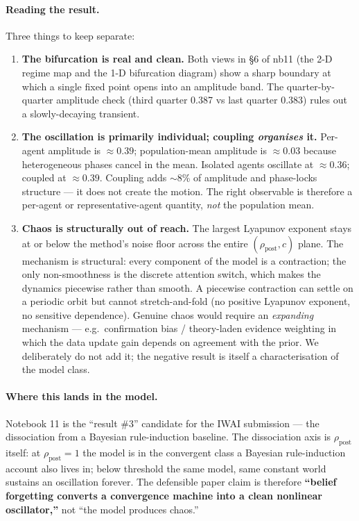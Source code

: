 \documentclass[11pt,a4paper]{article}
\theoremstyle{plain}
\begin{document}
\paragraph{Reading the result.} Three things to keep separate:
\begin{enumerate}\itemsep1pt
\item \textbf{The bifurcation is real and clean.} Both views in §6 of
nb11 (the 2-D regime map and the 1-D bifurcation diagram) show a sharp
boundary at which a single fixed point opens into an amplitude band.
The quarter-by-quarter amplitude check (third quarter 0.387 vs last
quarter 0.383) rules out a slowly-decaying transient.
\item \textbf{The oscillation is primarily individual; coupling
\emph{organises} it.} Per-agent amplitude is $\approx 0.39$;
population-mean amplitude is $\approx 0.03$ because heterogeneous phases
cancel in the mean. Isolated agents oscillate at $\approx 0.36$;
coupled at $\approx 0.39$. Coupling adds $\sim$8\% of amplitude and
phase-locks structure --- it does not create the motion. The right
observable is therefore a per-agent or representative-agent quantity,
\emph{not} the population mean.
\item \textbf{Chaos is structurally out of reach.} The largest Lyapunov
exponent stays at or below the method's noise floor across the entire
$(\rho_{\text{post}}, c)$ plane. The mechanism is structural: every
component of the model is a contraction; the only non-smoothness is the
discrete attention switch, which makes the dynamics piecewise rather
than smooth. A piecewise contraction can settle on a periodic orbit
but cannot stretch-and-fold (no positive Lyapunov exponent, no
sensitive dependence). Genuine chaos would require an \emph{expanding}
mechanism --- e.g.\ confirmation bias / theory-laden evidence weighting
in which the data update gain depends on agreement with the prior. We
deliberately do not add it; the negative result is itself a
characterisation of the model class.
\end{enumerate}

\paragraph{Where this lands in the model.} Notebook 11 is the
``result \#3'' candidate for the IWAI submission --- the dissociation
from a Bayesian rule-induction baseline. The dissociation axis is
$\rho_{\text{post}}$ itself: at $\rho_{\text{post}}=1$ the model is in
the convergent class a Bayesian rule-induction account also lives in;
below threshold the same model, same constant world sustains an
oscillation forever. The defensible paper claim is therefore
\textbf{``belief forgetting converts a convergence machine into a clean
nonlinear oscillator,''} not ``the model produces chaos.''
\end{document}
